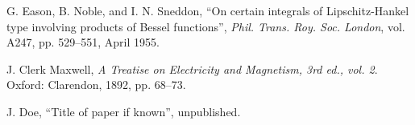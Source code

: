 \documentclass[]{NRSMRev}
\begin{document}











%
%
%
\begin{thebibliography}{1}


G. Eason, B. Noble, and I. N. Sneddon, ``On certain integrals of Lipschitz-Hankel type involving products of Bessel functions'', \emph{Phil. Trans. Roy. Soc. London}, vol. A247, pp. 529--551, April 1955.

J. Clerk Maxwell, \emph{A Treatise on Electricity and Magnetism, 3rd ed., vol. 2}. Oxford: Clarendon, 1892, pp. 68--73.

J. Doe, ``Title of paper if known'', unpublished. 
\end{thebibliography}




\end{document}
